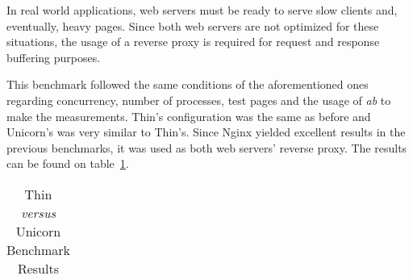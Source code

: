 In real world applications, web servers must be ready to serve slow clients and, eventually, heavy pages. Since both web servers are not optimized for these situations, the usage of a reverse proxy is required for request and response buffering purposes.

This benchmark followed the same conditions of the aforementioned ones regarding concurrency, number of processes, test pages and the usage of \textit{ab} to make the measurements. Thin's configuration was the same as before and Unicorn's was very similar to Thin's. Since Nginx yielded excellent results in the previous benchmarks, it was used as both web servers' reverse proxy. The results can be found on table~\ref{tab:thin_unicorn_benchmark}.

\begin{table}[h!t]
  \centering
  \caption{Thin \textit{versus} Unicorn Benchmark Results}
  \label{tab:thin_unicorn_benchmark}
  
  \begin{tabular}{c|c|c|c|c|c}


\end{tabular}
\end{table}
